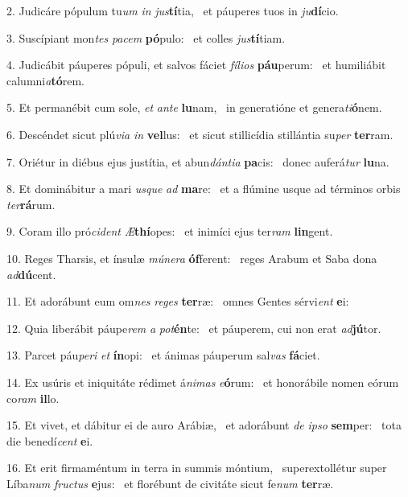 2. Judicáre pópulum tu\textit{um} \textit{in} \textit{jus}\textbf{tí}tia, \ast\  et páuperes tuos in \textit{ju}\textbf{dí}cio.\

3. Suscípiant mon\textit{tes} \textit{pa}\textit{cem} \textbf{pó}pulo: \ast\  et colles \textit{jus}\textbf{tí}tiam.\

4. Judicábit páuperes pópuli, et salvos fáciet \textit{fí}\textit{li}\textit{os} \textbf{páu}perum: \ast\  et humiliábit calumni\textit{a}\textbf{tó}rem.\

5. Et permanébit cum sole, \textit{et} \textit{an}\textit{te} \textbf{lu}nam, \ast\  in generatióne et genera\textit{ti}\textbf{ó}nem.\

6. Descéndet sicut plú\textit{vi}\textit{a} \textit{in} \textbf{vel}lus: \ast\  et sicut stillicídia stillántia su\textit{per} \textbf{ter}ram.\

7. Oriétur in diébus ejus justítia, et abun\textit{dán}\textit{ti}\textit{a} \textbf{pa}cis: \ast\  donec auferá\textit{tur} \textbf{lu}na.\

8. Et dominábitur a mari \textit{us}\textit{que} \textit{ad} \textbf{ma}re: \ast\  et a flúmine usque ad términos orbis \textit{ter}\textbf{rá}rum.\

9. Coram illo pró\textit{ci}\textit{dent} \textit{Æ}\textbf{thí}opes: \ast\  et inimíci ejus ter\textit{ram} \textbf{lin}gent.\

10. Reges Tharsis, et ínsulæ \textit{mú}\textit{ne}\textit{ra} \textbf{óf}ferent: \ast\  reges Arabum et Saba dona \textit{ad}\textbf{dú}cent.\

11. Et adorábunt eum om\textit{nes} \textit{re}\textit{ges} \textbf{ter}ræ: \ast\  omnes Gentes sérvi\textit{ent} \textbf{e}i:\

12. Quia liberábit páupe\textit{rem} \textit{a} \textit{pot}\textbf{én}te: \ast\  et páuperem, cui non erat \textit{ad}\textbf{jú}tor.\

13. Parcet páu\textit{pe}\textit{ri} \textit{et} \textbf{ín}opi: \ast\  et ánimas páuperum sal\textit{vas} \textbf{fá}ciet.\

14. Ex usúris et iniquitáte rédimet á\textit{ni}\textit{mas} \textit{e}\textbf{ó}rum: \ast\  et honorábile nomen eórum co\textit{ram} \textbf{il}lo.\

15. Et vivet, et dábitur ei de auro Arábiæ, \dag\  et adorábunt \textit{de} \textit{ip}\textit{so} \textbf{sem}per: \ast\  tota die benedí\textit{cent} \textbf{e}i.\

16. Et erit firmaméntum in terra in summis móntium, \dag\  superextollétur super Líba\textit{num} \textit{fruc}\textit{tus} \textbf{e}jus: \ast\  et florébunt de civitáte sicut fe\textit{num} \textbf{ter}ræ.\

